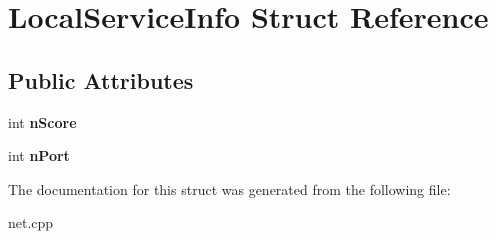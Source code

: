\hypertarget{struct_local_service_info}{}\section{Local\+Service\+Info Struct Reference}
\label{struct_local_service_info}
\subsection*{Public Attributes}
\begin{DoxyCompactItemize}
\item 
\mbox{\label{struct_local_service_info_ad6a9d404fb109ba1506df3f6ca842ed5}} 
int {\bfseries n\+Score}
\item 
\mbox{\label{struct_local_service_info_aa5c39fec8cc69a43e393bb158f69224b}} 
int {\bfseries n\+Port}
\end{DoxyCompactItemize}


The documentation for this struct was generated from the following file\+:\begin{DoxyCompactItemize}
\item 
net.\+cpp\end{DoxyCompactItemize}
